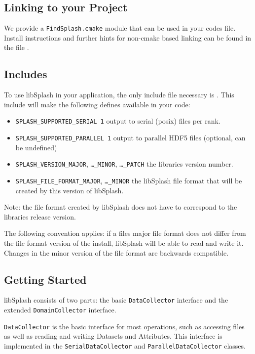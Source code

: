 \documentclass[a4paper,10pt,BCOR12mm]{report}
\newcommand{\code}[1]{\small \texttt{#1}}
\begin{document}
\subsection{Linking to your Project}

We provide a \code{FindSplash.cmake} module that can be used in your codes\newline
{} file. Install instructions and further hints for non-cmake based
linking can be found in the file  .

\subsection{Includes}

To use libSplash in your application, the only include file necessary is\newline
{} .
This include will make the following defines available in your code:
\begin{itemize}
    \item \code{SPLASH\_SUPPORTED\_SERIAL 1} output to serial (posix) files per rank.
    \item \code{SPLASH\_SUPPORTED\_PARALLEL 1} output to parallel HDF5 files
          (optional, can be undefined)
    \item \code{SPLASH\_VERSION\_MAJOR}, \code{\dots\_MINOR}, \code{\dots\_PATCH}
          the libraries version number.
    \item \code{SPLASH\_FILE\_FORMAT\_MAJOR}, \code{\dots\_MINOR} the libSplash file
          format that will be created by this version of libSplash.
\end{itemize}

Note: the file format created by libSplash does not have to correspond to the libraries
release version.

The following convention applies: if a files major file format does not differ from the
file format version of the install, libSplash will be able to read and write it.
Changes in the minor version of the file format are backwards compatible.

\subsection{Getting Started}

libSplash consists of two parts: the basic \code{DataCollector} interface and the extended \code{DomainCollector} interface.

\code{DataCollector} is the basic interface for most operations, such as accessing files as well as reading
and writing Datasets and Attributes.
This interface is implemented in the \code{SerialDataCollector} and \code{ParallelDataCollector} classes.
\end{document}
